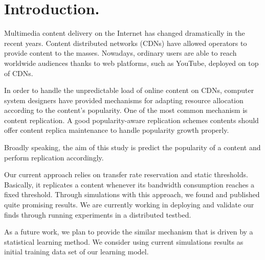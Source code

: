 	\section{Introduction.}

		Multimedia content delivery on the Internet has changed dramatically in the recent
		years. Content distributed networks (CDNs) have allowed operators to
		provide content to the masses. Nowadays, ordinary users are able to 
		reach worldwide audiences thanks to web platforms, such as YouTube, deployed on top of CDNs.

		In order to handle the unpredictable load of online content on CDNs, computer system designers have provided
		mechanisms for adapting resource allocation according to the content's popularity.
		One of the most common mechanism is content replication.
		A good popularity-aware replication schemes contents should offer content replica 	
		maintenance to handle popularity growth properly.

		Broadly speaking, the aim of this study is predict the popularity of a content and
		perform replication accordingly. 

		Our current approach relies on transfer rate reservation and static thresholds. 
		Basically, it replicates a content whenever its bandwidth consumption reaches a fixed
		threshold. Through simulations with this approach, we found and published quite promising results. We are currently working in deploying and validate our finds through
		running experiments in a distributed testbed.
 
		As a future work, we plan to provide the similar mechanism that is driven by a statistical learning method. We consider using current simulations results as initial training data set of our learning model. 

		\clearpage 
 

